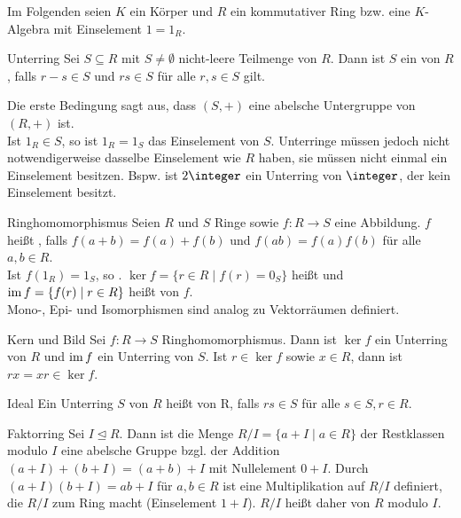 \begin{Bem}
    Im Folgenden seien $K$ ein Körper und $R$ ein kommutativer Ring
    bzw. eine $K$-Algebra mit Einselement $1 = 1_R$.
\end{Bem}

\begin{Def}{Unterring}
    Sei $S \subseteq R$ mit $S \not= \emptyset$ nicht-leere Teilmenge von $R$.
    Dann ist $S$ ein  von $R$, falls
    $r - s \in S$ und $rs \in S$ für alle $r, s \in S$ gilt.
\end{Def}

\begin{Bem}
    Die erste Bedingung sagt aus, dass $(S, +)$ eine abelsche
    Untergruppe von $(R, +)$ ist. \\
    Ist $1_R \in S$, so ist $1_R = 1_S$ das Einselement von $S$.
    Unterringe müssen jedoch nicht notwendigerweise dasselbe Einselement
    wie $R$ haben, sie müssen nicht einmal ein Einselement besitzen.
    Bspw. ist $2 \integer$ ein Unterring von $\integer$, der kein
    Einselement besitzt.
\end{Bem}

\begin{Def}{Ringhomomorphismus}
    Seien $R$ und $S$ Ringe sowie $f: R \rightarrow S$ eine Abbildung.
    $f$ heißt , falls
    $f(a + b) = f(a) + f(b)$ und $f(ab) = f(a) f(b)$ für alle $a, b \in R$. \\
    Ist $f(1_R) = 1_S$, so .
    $\ker f = \{r \in R \;|\; f(r) = 0_S\}$ heißt 
    und $\operatorname{im} f = \{f(r) \;|\; r \in R\}$ heißt  von $f$. \\
    Mono-, Epi- und Isomorphismen sind analog zu Vektorräumen definiert.
\end{Def}

\begin{Lemma}{Kern und Bild}
    Sei $f: R \rightarrow S$ Ringhomomorphismus.
    Dann ist $\ker f$ ein Unterring von $R$ und $\operatorname{im} f$ ein Unterring von $S$.
    Ist $r \in \ker f$ sowie $x \in R$, dann ist $rx = xr \in \ker f$.
\end{Lemma}

\begin{Def}{Ideal}
    Ein Unterring $S$ von $R$ heißt  von R, falls
    $rs \in S$ für alle $s \in S, r \in R$.
\end{Def}

\begin{Def}{Faktorring}
    Sei $I \trianglelefteq R$.
    Dann ist die Menge $R/I = \{a + I \;|\; a \in R\}$ der Restklassen modulo
    $I$ eine abelsche Gruppe bzgl. der Addition
    $(a + I) + (b + I) = (a + b) + I$ mit Nullelement $0 + I$.
    Durch $(a + I)(b + I) = ab + I$ für $a, b \in R$ ist eine Multiplikation
    auf $R/I$ definiert, die $R/I$ zum Ring macht
    (Einselement $1 + I$).
    $R/I$ heißt daher  von $R$ modulo $I$.
\end{Def}

